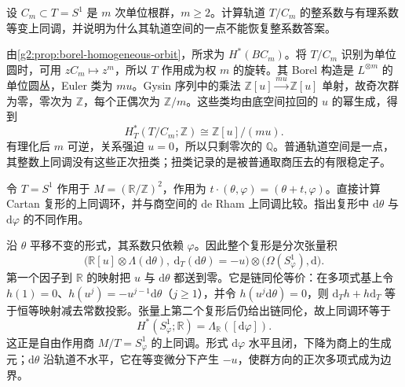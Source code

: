 \begin{exercise}\label{g2:ex:finite-isotropy-orbit}
	设 \(C_m\subset T=S^1\) 是 \(m\) 次单位根群，\(m\ge2\)。计算轨道 \(T/C_m\) 的整系数与有理系数等变上同调，并说明为什么其轨道空间的一点不能恢复整系数答案。
\end{exercise}
\begin{solution}
	由\cref{g2:prop:borel-homogeneous-orbit}，所求为 \(H^*(BC_m)\)。将 \(T/C_m\) 识别为单位圆时，可用 \(zC_m\mapsto z^m\)，所以 \(T\) 作用成为权 \(m\) 的旋转。其 Borel 构造是 \(L^{\otimes m}\) 的单位圆丛，Euler 类为 \(mu\)。Gysin 序列中的乘法 \(\mathbb Z[u]\xrightarrow{mu}\mathbb Z[u]\) 单射，故奇次群为零，零次为 \(\mathbb Z\)，每个正偶次为 \(\mathbb Z/m\)。这些类均由底空间拉回的 \(u\) 的幂生成，得到
	\[
		H_T^*(T/C_m;\mathbb Z)\cong\mathbb Z[u]/(mu).
	\]
	有理化后 \(m\) 可逆，关系强迫 \(u=0\)，所以只剩零次的 \(\mathbb Q\)。普通轨道空间是一点，其整数上同调没有这些正次扭类；扭类记录的是被普通取商压去的有限稳定子。
\end{solution}

\begin{exercise}\label{g2:ex:cartan-free-torus}
	令 \(T=S^1\) 作用于 \(M=(\mathbb R/\mathbb Z)^2\)，作用为 \(t\cdot(\theta,\varphi)=(\theta+t,\varphi)\)。直接计算 Cartan 复形的上同调环，并与商空间的 de Rham 上同调比较。指出复形中 \(\mathrm d\theta\) 与 \(\mathrm d\varphi\) 的不同作用。
\end{exercise}
\begin{solution}
	沿 \(\theta\) 平移不变的形式，其系数只依赖 \(\varphi\)。因此整个复形是分次张量积
	\[
		\bigl(\mathbb R[u]\otimes\Lambda(\mathrm d\theta),\ \mathrm d_T(\mathrm d\theta)=-u\bigr)
		\otimes\bigl(\Omega(S^1_\varphi),\mathrm d\bigr).
	\]
	第一个因子到 \(\mathbb R\) 的映射把 \(u\) 与 \(\mathrm d\theta\) 都送到零。它是链同伦等价：在多项式基上令 \(h(1)=0\)、\(h(u^j)=-u^{j-1}\mathrm d\theta\)（\(j\ge1\)），并令 \(h(u^j\mathrm d\theta)=0\)，则 \(\mathrm d_T h+h\mathrm d_T\) 等于恒等映射减去常数投影。张量上第二个复形后仍给出链同伦，故上同调环等于
	\[
		H^*(S^1_\varphi;\mathbb R)=\Lambda_{\mathbb R}([\mathrm d\varphi]).
	\]
	这正是自由作用商 \(M/T=S^1_\varphi\) 的上同调。形式 \(\mathrm d\varphi\) 水平且闭，下降为商上的生成元；\(\mathrm d\theta\) 沿轨道不水平，它在等变微分下产生 \(-u\)，使群方向的正次多项式成为边界。
\end{solution}

